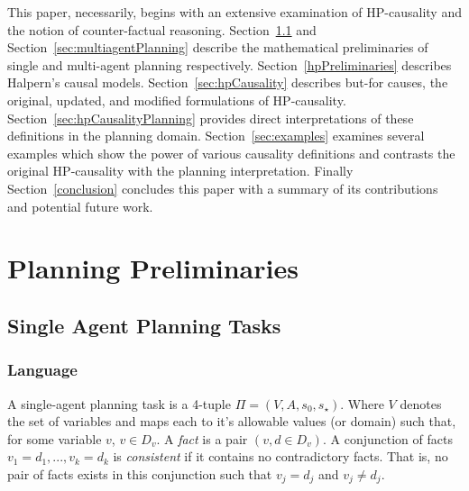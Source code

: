 \documentclass{article}
\theoremstyle{plain}
\theoremstyle{definition}
\begin{document}
This paper, necessarily, begins with an extensive examination of HP-causality and the notion of counter-factual reasoning. Section~\ref{sec:singleAgentPlanning} and Section~\ref{sec:multiagentPlanning} describe the mathematical preliminaries of single and multi-agent planning respectively. Section~\ref{hpPreliminaries} describes Halpern's causal models. Section~\ref{sec:hpCausality} describes but-for causes, the original, updated, and modified formulations of HP-causality. Section~\ref{sec:hpCausalityPlanning} provides direct interpretations of these definitions in the planning domain. Section~\ref{sec:examples} examines several examples which show the power of various causality definitions and contrasts the original HP-causality with the planning interpretation. Finally Section~\ref{conclusion} concludes this paper with a summary of its contributions and potential future work.

\section{Planning Preliminaries}

\subsection{Single Agent Planning Tasks} \label{sec:singleAgentPlanning}
\subsubsection*{Language}
A single-agent planning task is a 4-tuple $\Pi=(V, A, s_0, s_\star)$. Where $V$ denotes the set of variables and maps each to it's allowable values (or domain) such that, for some variable $v$, $v \in D_v$. A \textit{fact} is a pair $(v, d \in D_v)$. A conjunction of facts $v_1=d_1,...,v_k=d_k$ is \textit{consistent} if it contains no contradictory facts. That is, no pair of facts exists in this conjunction such that $v_j=d_j$ and $v_j \neq d_j$.
\end{document}
